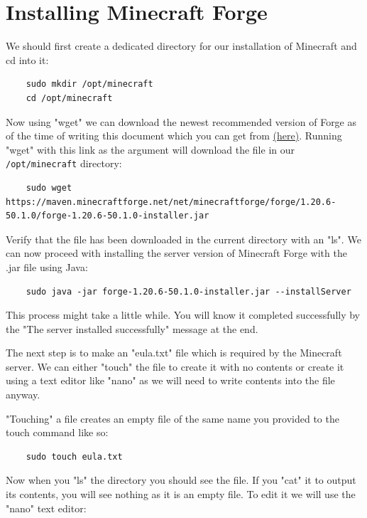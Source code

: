 \documentclass[]{article}
\begin{document}
\section{Installing Minecraft Forge}

We should first create a dedicated directory for our installation of Minecraft and cd into it:

\begin{verbatim}
	sudo mkdir /opt/minecraft
	cd /opt/minecraft
\end{verbatim}

Now using "wget" we can download the newest recommended version of Forge as of the time of writing this document which you can get from \href{https://maven.minecraftforge.net/net/minecraftforge/forge/1.20.6-50.1.0/forge-1.20.6-50.1.0-installer.jar}{(here)}. Running "wget" with this link as the argument will download the file in our \texttt{/opt/minecraft} directory:

\begin{verbatim}
	sudo wget https://maven.minecraftforge.net/net/minecraftforge/forge/1.20.6-50.1.0/forge-1.20.6-50.1.0-installer.jar
\end{verbatim}

Verify that the file has been downloaded in the current directory with an "ls". We can now proceed with installing the server version of Minecraft Forge with the .jar file using Java:

\begin{verbatim}
	sudo java -jar forge-1.20.6-50.1.0-installer.jar --installServer
\end{verbatim}

This process might take a little while. You will know it completed successfully by the  "The server installed successfully" message at the end.

The next step is to make an "eula.txt" file which is required by the Minecraft server. We can either "touch" the file to create it with no contents or create it using a text editor like "nano" as we will need to write contents into the file anyway.

"Touching" a file creates an empty file of the same name you provided to the touch command like so:

\begin{verbatim}
	sudo touch eula.txt
\end{verbatim}

Now when you "ls" the directory you should see the file. If you "cat" it to output its contents, you will see nothing as it is an empty file. To edit it we will use the "nano" text editor:
\end{document}
